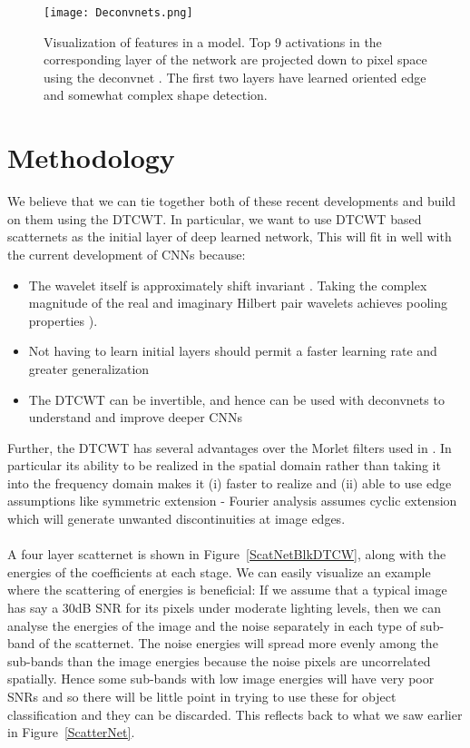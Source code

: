\documentclass[12pt, a4paper, oneside, english]{article}
\begin{document}
\begin{figure}
\centering
\texttt{[image: Deconvnets.png]}
\caption{Visualization of features in a model. Top 9 activations in the corresponding layer of the network are projected down to pixel space using the deconvnet \cite{zeiler_visualizing_compact_2014}. The first two layers have learned oriented edge and somewhat complex shape detection.}
\label{DeconvNet}
\end{figure}

\section{Methodology}
We believe that we can tie together both of these recent developments and build on them using the DTCWT. In particular, we want to use DTCWT based scatternets as the initial layer of deep learned network, This will fit in well with the current development of CNNs because:
\begin{itemize}
\item The wavelet itself is approximately shift invariant \cite{kingsbury_rotation-invariant_2006}. Taking the complex magnitude of the real and imaginary Hilbert pair wavelets achieves pooling properties \cite{kingsbury_dual-tree_2000}).
\item Not having to learn initial layers should permit a faster learning rate and greater generalization
\item The DTCWT can be invertible, and hence can be used with deconvnets to understand and improve deeper CNNs
\end{itemize}
Further, the DTCWT has several advantages over the Morlet filters used in \cite{sifre_rotation_2013, sifre_rigid-motion_2014, bruna_invariant_2013, oyallon_generic_2013}. In particular its ability to be realized in the spatial domain rather than taking it into the frequency domain makes it (i) faster to realize and (ii) able to use edge assumptions like symmetric extension - Fourier analysis assumes cyclic extension which will generate unwanted discontinuities at image edges.\\\\
A four layer scatternet is shown in Figure~\ref{ScatNetBlkDTCW}, along with the energies of the coefficients at each stage. We can easily visualize an example where the scattering of energies is beneficial: If we assume that a typical image has say a 30dB SNR for its pixels under moderate lighting levels, then we can analyse the energies of the image and the noise separately in each type of sub-band of the scatternet. The noise energies will spread more evenly among the sub-bands than the image energies because the noise pixels are uncorrelated spatially.  Hence some sub-bands with low image energies will have very poor SNRs and so there will be little point in trying to use these for object classification and they can be discarded. This reflects back to what we saw earlier in Figure~\ref{ScatterNet}.\\\\
\end{document}

